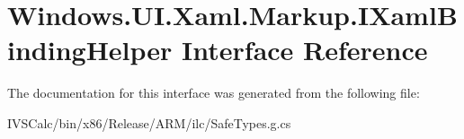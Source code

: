 \hypertarget{interface_windows_1_1_u_i_1_1_xaml_1_1_markup_1_1_i_xaml_binding_helper}{}\section{Windows.\+U\+I.\+Xaml.\+Markup.\+I\+Xaml\+Binding\+Helper Interface Reference}
\label{interface_windows_1_1_u_i_1_1_xaml_1_1_markup_1_1_i_xaml_binding_helper}


The documentation for this interface was generated from the following file\+:\begin{DoxyCompactItemize}
\item 
I\+V\+S\+Calc/bin/x86/\+Release/\+A\+R\+M/ilc/Safe\+Types.\+g.\+cs\end{DoxyCompactItemize}
